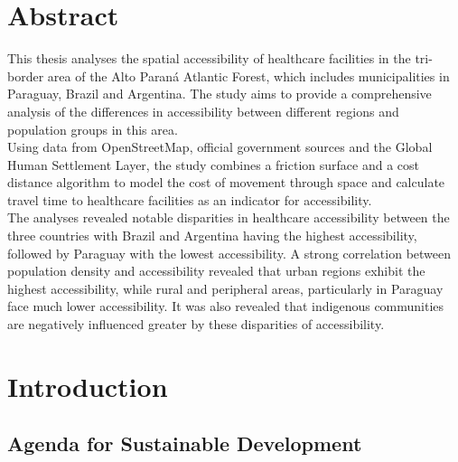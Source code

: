 \documentclass[11pt, a4paper]{report}
\begin{document}
\chapter*{Abstract}

This thesis analyses the spatial accessibility of healthcare facilities in the tri-border area of the Alto Paraná Atlantic Forest, which includes municipalities in Paraguay, Brazil and Argentina. The study aims to provide a comprehensive analysis of the differences in accessibility between different regions and population groups in this area. \\
%
Using data from OpenStreetMap, official government sources and the Global Human Settlement Layer, the study combines a friction surface and a cost distance algorithm to model the cost of movement through space and calculate travel time to healthcare facilities as an indicator for accessibility.\\
%
The analyses revealed notable disparities in healthcare accessibility between the three countries with Brazil and Argentina having the highest accessibility, followed by Paraguay with the lowest accessibility. A strong correlation between population density and accessibility revealed that urban regions exhibit the highest accessibility, while rural and peripheral areas, particularly in Paraguay face much lower accessibility. It was also revealed that indigenous communities are negatively influenced greater by these disparities of accessibility.  \\
%

\chapter{Introduction}
\section{Agenda for Sustainable Development}\label{sec:introagenda}
\end{document}
